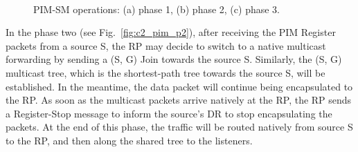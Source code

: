 \begin{figure}[h!]
\centering
{}\,
\,
\caption[The operations of PIM-SM]{PIM-SM operations: (a) phase 1, (b) phase 2, (c) phase 3.}
\label{c2_pim_operation}
\end{figure}

In the phase two (see Fig.~\ref{fig:c2_pim_p2}), after receiving the PIM Register packets from a source S, the RP may decide to switch to a native multicast forwarding by sending a (S, G) Join towards the source S. Similarly, the (S, G) multicast tree, which is the shortest-path tree towards the source S, will be established. In the meantime, the data packet will continue being encapsulated to the RP. As soon as the multicast packets arrive natively at the RP, the RP sends a Register-Stop message to inform the source's DR to stop encapsulating the packets. At the end of this phase, the traffic will be routed natively from source S to the RP, and then along the shared tree to the listeners.      

